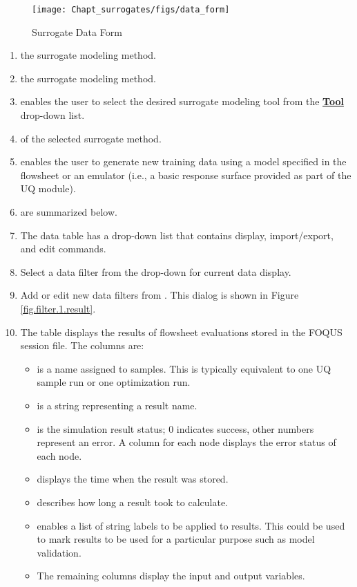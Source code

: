 \begin{figure}[H]
	\begin{center}
		\texttt{[image: Chapt\_surrogates/figs/data\_form]}
		\caption{Surrogate Data Form}
		\label{fig.surrogate.data}
	\end{center}
\end{figure}
\begin{enumerate}
	\item {} the surrogate modeling method.
	\item {} the surrogate modeling method.
	\item {} enables the user to select the desired surrogate modeling tool from the \textbf{\underline{Tool}} drop-down list.
	\item {} of the selected surrogate method.
	\item {} enables the user to generate new training data using a model specified in the flowsheet or an emulator (i.e., a basic response surface provided as part of the UQ module).
	\item {} are summarized below.
	\item The data table has a  drop-down list that contains display, import/export, and edit commands. 
	\item Select a data filter from the  drop-down for current data display.
	\item Add or edit new data filters from . This dialog is shown in Figure \ref{fig.filter.1.result}.
	\item The  table displays the results of flowsheet evaluations stored in the FOQUS session file. The columns are:
	\begin{itemize}
		\item {} is a name assigned to samples. This is typically
        equivalent to one UQ sample run or one optimization run.
		\item {} is a string representing a result name.
		\item {} is the simulation result status; 0 indicates success, other numbers represent an error. A column for each node displays the error status of each node.
		\item {} displays the time when the result was stored.
		\item {} describes how long a result took to calculate. 
		\item {} enables a list of string labels to be applied to results. This could be used to mark results to be used for a particular purpose such as model validation.
		\item The remaining columns display the input and output variables.
	\end{itemize}
\end{enumerate}

